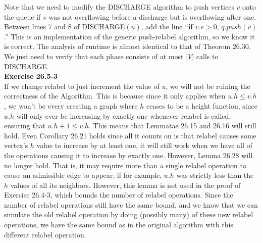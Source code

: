 \documentclass{article}
\begin{document}
Note that we need to modify the DISCHARGE algorithm to push vertices $v$ onto the queue if $v$ was not overflowing before a discharge but is overflowing after one.  Between lines 7 and 8 of DISCHARGE$(u)$, add the line ``\textbf{if} $v.e > 0$, $q.push(v)$.''  This is an implementation of the generic push-relabel algorithm, so we know it is correct.  The analysis of runtime is almost identical to that of Theorem 26.30. We just need to verify that each phase consists of at most $|V|$ calls to DISCHARGE.\\




\noindent\textbf{Exercise 26.5-3}\\

If we change relabel to just increment the value of $u$, we will not be ruining the correctness of the Algorithm. This is because since it only applies when $u.h\le v.h$, we won't be every creating a graph where $h$ ceases to be a height function, since $u.h$ will only ever be increasing by exactly one whenever relabel is called, ensuring that $u.h +1 \le v.h$. This means that Lemmatae 26.15 and 26.16 will still hold. Even Corollary 26.21 holds since all it counts on is that relabel causes some vertex's $h$ value to increase by at least one, it will still work when we have all of the operations causing it to increase by exactly one. However, Lemma 26.28 will no longer hold. That is, it may require more than a single relabel operation to cause an admissible edge to appear, if for example, $u.h$ was strictly less than the $h$ values of all its neighbors. However, this lemma is not used in the proof of Exercise 26.4-3, which bounds the number of relabel operations. Since the number of relabel operations still have the same bound, and we know that we can simulate the old relabel operation by doing (possibly many) of these new relabel operations, we have the same bound as in the original algorithm with this different relabel operation.\\
\end{document}
